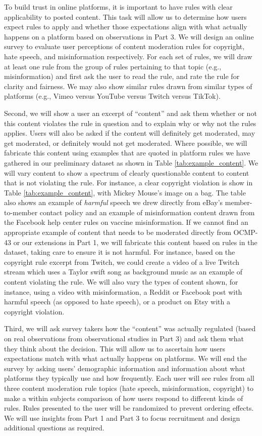 To build trust in online platforms, it is important to have rules with clear applicability to posted content. This task will allow us to determine how users expect rules to apply and whether those expectations align with what actually happens on a
platform based on observations in Part 3. We will design an
online survey to evaluate user perceptions of content
moderation rules for copyright, hate speech, and misinformation respectively.
For each set of rules, we will draw at least one rule from the group of rules
pertaining to that topic (e.g., misinformation) and first ask the user to read
the rule, and rate the rule for clarity and fairness. We may also show similar rules drawn from similar types of platforms (e.g., Vimeo versus YouTube versus Twitch versus TikTok).

Second, we will show a user an excerpt of ``content'' and ask them
whether or not this content violates the rule in question and to explain why
or why not the rules applies. Users will also be asked if the content will definitely get moderated, may get moderated, or definitely would not get moderated. Where possible, we will fabricate this content using examples that are quoted in platform rules we have gathered in our preliminary dataset as shown in Table \ref{tab:example_content}. We will vary content to show a spectrum of clearly questionable content to content that is not violating the rule. For instance, a clear copyright violation is show in Table \ref{tab:example_content}, with Mickey Mouse's image on a bag. The table also shows an example of \textit{harmful} speech we drew directly from eBay's member-to-member contact policy and an example of misinformation content drawn from the Facebook help center rules on vaccine misinformation. If we cannot find an appropriate example of content that needs to be moderated directly from OCMP-43 or our extensions in Part 1, we will fabricate this content based on rules in the dataset, taking care to ensure it is not harmful. For instance, based on the copyright rule excerpt from Twitch, we could create a video of a live Twitch stream which uses a Taylor swift song as background music as an example of content violating the rule. We will also vary the types of content shown, for
instance, using a video with misinformation, a Reddit or Facebook post with
harmful speech (as opposed to hate speech), or a product on Etsy with a copyright violation.

Third, we will ask survey takers how the ``content'' was actually regulated (based on real
observations from observational studies in Part 3) and ask them what they think about the
decision. This will allow us to ascertain how users expectations match with
what actually happens on platforms. We will end the survey by asking
users' demographic information and information about what platforms they
typically use and how frequently. Each user will see
rules from all three content moderation rule topics (hate speech, misinformation, copyright) to make a within subjects
comparison of how users respond to different kinds of rules. Rules presented
to the user will be randomized to prevent ordering effects. We will use insights from Part 1 and Part 3 to focus
recruitment and design additional questions as required. 

